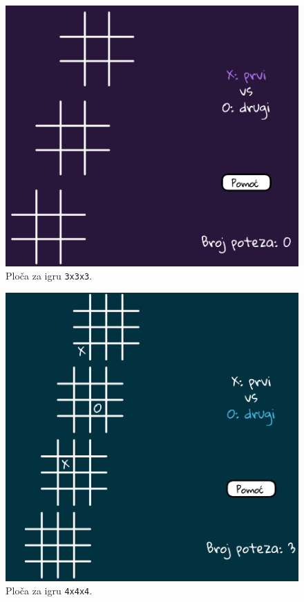 \documentclass[12pt]{scrartcl}
\begin{document}
\begin{figure}[h]
	\centering
	\includegraphics[scale=0.35]{ploca3.png}
	\caption{Ploča za igru \texttt{3x3x3}.}
	\label{fig:ploca3}
\end{figure}

\begin{figure}[h]
	\centering
	\includegraphics[scale=0.35]{ploca4.png}
	\caption{Ploča za igru \texttt{4x4x4}.}
	\label{fig:ploca4}
\end{figure}
\end{document}
